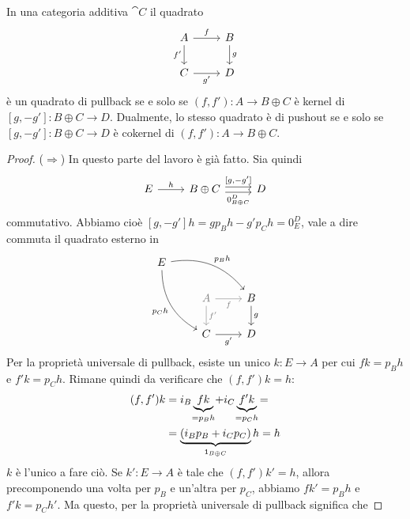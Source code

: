 \begin{proposition}\label{proposition:FromPullbackToKernel}
  In una categoria additiva \(\cat C\) il quadrato
  \[
    \begin{tikzcd}
      A \ar["{f}", r] \ar["{f'}", d, swap] & B \ar["{g}", d] \\
      C \ar["{g'}", r, swap] & D
    \end{tikzcd}
  \]
  è un quadrato di pullback se e solo se \((f, f') : A \to B \oplus C\)
  è kernel di \([g, -g'] : B \oplus C \to D\). Dualmente, lo stesso
  quadrato è di pushout se e solo se \([g, -g'] : B \oplus C \to D\) è
  cokernel di \((f, f') : A \to B \oplus C\).
\end{proposition}

\begin{proof}
  (\(\Rightarrow\)) In questo parte del lavoro è già fatto. Sia quindi
  \[
    \begin{tikzcd}
      E \ar["{h}", r] & B \oplus C \ar["{[g, -g']}", r, shift left]
      \ar["{0_{B \oplus C}^D}", r, shift right, swap] & D
    \end{tikzcd}
  \]
  commutativo. Abbiamo cioè \([g, -g'] h = g p_B h - g' p_C h = 0_E^D\),
  vale a dire commuta il quadrato esterno in
  \[
    \begin{tikzcd}
      E \ar["{p_B h}", drr, bend left] \ar["{p_C h}", ddr, swap,
      bend right] \\
      & {\color{gray} A} \ar["{f}" gray, gray, r, swap] \ar["{f'}" gray, gray, d] & B \ar["{g}", d] \\
      & C \ar["{g'}", r, swap] & D
    \end{tikzcd}
  \]
  Per la proprietà universale di pullback, esiste un unico
  \(k : E \to A\) per cui \(f k = p_B h\) e \(f' k = p_C h\). Rimane
  quindi da verificare che \((f, f') k = h\):
  \begin{align*}
    (f, f') k &= i_B \underbrace{f k}_{\crampedclap{=p_B h}} + i_C \underbrace{f' k}_{\crampedclap{=p_C h}} = \\
              &= \underbrace{(i_B p_B + i_C p_C)}_{\id_{B \oplus C}} h = h
  \end{align*}
  \(k\) è l'unico a fare ciò. Se \(k' : E \to A\) è tale che
  \((f, f') k' = h\), allora precomponendo una volta per \(p_B\) e
  un'altra per \(p_C\), abbiamo \(f k' = p_B h\) e \(f' k = p_C h'\). Ma
  questo, per la proprietà universale di pullback significa che

\end{proof}
